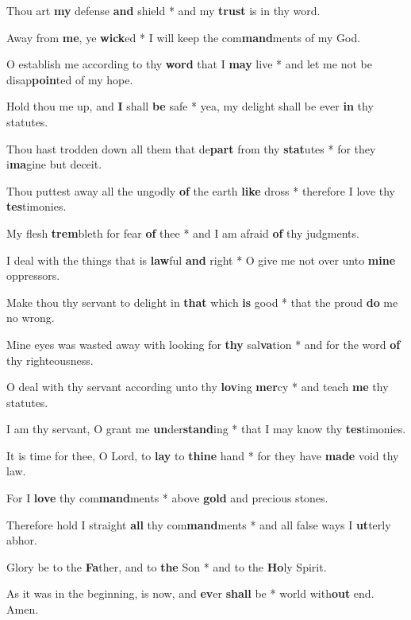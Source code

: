 \begin{multicols}{2}
	Thou art \textbf{my} defense \textbf{and} shield * and my \textbf{trust} is in thy word.
	
	Away from \textbf{me}, ye \textbf{wick}ed * I will keep the com\textbf{mand}ments of my God.
	
	O establish me according to thy \textbf{word} that I \textbf{may} live * and let me not be disap\textbf{poin}ted of my hope.
	
	Hold thou me up, and \textbf{I} shall \textbf{be} safe * yea, my delight shall be ever \textbf{in} thy statutes.
	
	Thou hast trodden down all them that de\textbf{part} from thy \textbf{stat}utes * for they i\textbf{ma}gine but deceit.
	
	Thou puttest away all the ungodly \textbf{of} the earth \textbf{like} dross * therefore I love thy \textbf{tes}timonies.
	
	My flesh \textbf{trem}bleth for fear \textbf{of} thee * and I am afraid \textbf{of} thy judgments.
	
	I deal with the things that is \textbf{law}ful \textbf{and} right * O give me not over unto \textbf{mine} oppressors.
	
	Make thou thy servant to delight in \textbf{that} which \textbf{is} good * that the proud \textbf{do} me no wrong.
	
	Mine eyes was wasted away with looking for \textbf{thy} sal\textbf{va}tion * and for the word \textbf{of} thy righteousness.
	
	O deal with thy servant according unto thy \textbf{lov}ing \textbf{mer}cy * and teach \textbf{me} thy statutes.
	
	I am thy servant, O grant me \textbf{un}der\textbf{stand}ing * that I may know thy \textbf{tes}timonies.
	
	It is time for thee, O Lord, to \textbf{lay} to \textbf{thine} hand * for they have \textbf{made} void thy law.
	
	For I \textbf{love} thy com\textbf{mand}ments * above \textbf{gold} and precious stones.
	
	Therefore hold I straight \textbf{all} thy com\textbf{mand}ments * and all false ways I \textbf{ut}terly abhor.
	
	Glory be to the \textbf{Fa}ther, and to \textbf{the} Son * and to the \textbf{Ho}ly Spirit.
	
	As it was in the beginning, is now, and \textbf{ev}er \textbf{shall} be * world with\textbf{out} end. Amen.
\end{multicols}